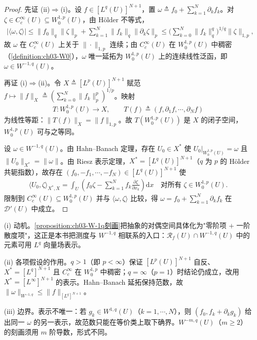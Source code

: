 \documentclass[../../main.tex]{subfiles}%
\begin{document}
\begin{proof}
先证 (ii)$\Rightarrow$(i)。设 $f\in[L^q(U)]^{N+1}$，置 $\omega\triangleq f_0+\sum_{k=1}^N\partial_kf_k$。对 $\zeta\in C^\infty_c(U)\subseteq W^{1,p}_0(U)$，由 Hölder 不等式，
\begin{align*}
|\langle\omega,\zeta\rangle|
\leqslant\|f_0\|_q\|\zeta\|_p+\sum_{k=1}^N\|f_k\|_q\|\partial_k\zeta\|_p
\leqslant\Big(\sum_{k=0}^N\|f_k\|_q^q\Big)^{1/q}\|\zeta\|_{1,p},
\end{align*}
故 $\omega$ 在 $C^\infty_c(U)$ 上关于 $\|\cdot\|_{1,p}$ 连续；由 $C^\infty_c(U)$ 在 $W^{1,p}_0(U)$ 中稠密（\cref{definition:ch03-W0}），$\omega$ 唯一延拓为 $W^{1,p}_0(U)$ 上的连续线性泛函，即 $\omega\in W^{-1,q}(U)$。

再证 (i)$\Rightarrow$(ii)。令 $X\triangleq[L^p(U)]^{N+1}$ 赋范 $f\mapsto\|f\|_X\triangleq(\sum_{k=0}^N\|f_k\|_p^p)^{1/p}$。映射
\begin{align*}
T:W^{1,p}_0(U)\to X,\qquad T(f)\triangleq(f,\partial_1f,\cdots ,\partial_Nf)
\end{align*}
为线性等距：$\|T(f)\|_X=\|f\|_{1,p}$。故 $T(W^{1,p}_0(U))$ 是 $X$ 的闭子空间，$W^{1,p}_0(U)$ 可与之等同。

设 $\omega\in W^{-1,q}(U)$。由 Hahn--Banach 定理，存在 $U_0\in X^*$ 使 $U_0|_{W^{1,p}_0(U)}=\omega$ 且 $\|U_0\|_{X^*}=\|\omega\|$。由 Riesz 表示定理，$X^*=[L^q(U)]^{N+1}$（$q$ 为 $p$ 的 Hölder 共轭指数），故存在 $(f_0,-f_1,\cdots ,-f_N)\in[L^q(U)]^{N+1}$ 使
\begin{align*}
\langle U_0,\zeta\rangle_{X^*,X}=\int_U\left(f_0\zeta-\sum_{k=1}^Nf_k\frac{\partial\zeta}{\partial x_k}\right)\mathrm{d}x
\quad \text{对所有 }\zeta\in W^{1,p}_0(U).
\end{align*}
限制到 $C^\infty_c(U)\subseteq W^{1,p}_0(U)$ 并与 $\langle\omega,\zeta\rangle$ 比较，得 $\omega=f_0+\sum_{k=1}^N\partial_kf_k$ 在 $\mathcal{D}'(U)$ 中成立。
\end{proof}

\begin{remark}\label{remark:ch03-W-1q刻画动机}
(i) 动机。\cref{proposition:ch03-W-1q刻画}把抽象的对偶空间具体化为"零阶项 $+$ 一阶散度项"，这正是本书把测度与 $W^{-1,q}$ 相联系的入口：$\mathscr{R}_f(U)\cap W^{-1,q}(U)$ 中的元素可用 $L^q$ 向量场表示。

(ii) 各项假设的作用。$q>1$（即 $p<\infty$）保证 $[L^p(U)]^{N+1}$ 自反、$X^*=[L^q]^{N+1}$ 且 $C^\infty_c$ 在 $W^{1,p}_0$ 中稠密；$q=\infty$（$p=1$）时结论仍成立，改用 $X^*=[L^\infty]^{N+1}$ 的表示。Hahn--Banach 延拓保持范数，故 $\|\omega\|_{W^{-1,q}}\leqslant\|f\|_{[L^q]^{N+1}}$。

(iii) 边界。表示不唯一：若 $g_k\in W^{1,q}(U)$（$k=1,\cdots ,N$），则 $(f_0,f_k+\partial_kg_k)$ 给出同一 $\omega$ 的另一表示，故范数只能在等价类上取下确界。$W^{-m,q}(U)$（$m\geqslant2$）的刻画须用 $m$ 阶导数，形式不同。
\end{remark}
\end{document}
